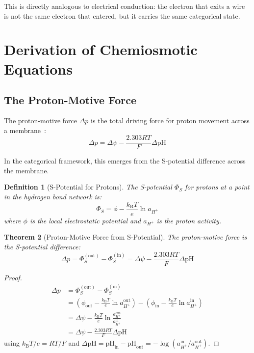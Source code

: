 \documentclass[twocolumn,showpacs,preprintnumbers,amsmath,amssymb,prd]{revtex4-2}
\newtheorem{theorem}{Theorem}[section]
\newtheorem{definition}[theorem]{Definition}
\newcommand{\kB}{k_{\text{B}}}
\begin{document}
This is directly analogous to electrical conduction: the electron that exits a wire is not the same electron that entered, but it carries the same categorical state.


\section{Derivation of Chemiosmotic Equations}
\label{sec:chemiosmotic}

\subsection{The Proton-Motive Force}

The proton-motive force $\Delta p$ is the total driving force for proton movement across a membrane~\cite{Nicholls2013}:
\begin{equation}
\Delta p = \Delta\psi - \frac{2.303 RT}{F}\Delta\text{pH}
\label{eq:pmf}
\end{equation}

In the categorical framework, this emerges from the S-potential difference across the membrane.

\begin{definition}[S-Potential for Protons]
\label{def:s_potential_h}
The S-potential $\Phi_S$ for protons at a point in the hydrogen bond network is:
\begin{equation}
\Phi_S = \phi - \frac{\kB T}{e}\ln a_{H^+}
\label{eq:s_potential_h}
\end{equation}
where $\phi$ is the local electrostatic potential and $a_{H^+}$ is the proton activity.
\end{definition}

\begin{theorem}[Proton-Motive Force from S-Potential]
\label{thm:pmf}
The proton-motive force is the S-potential difference:
\begin{equation}
\Delta p = \Phi_S^{(\text{out})} - \Phi_S^{(\text{in})} = \Delta\psi - \frac{2.303RT}{F}\Delta\text{pH}
\label{eq:pmf_s}
\end{equation}
\end{theorem}

\begin{proof}
\begin{align}
\Delta p &= \Phi_S^{(\text{out})} - \Phi_S^{(\text{in})} \\
&= \left(\phi_{\text{out}} - \frac{\kB T}{e}\ln a_{H^+}^{\text{out}}\right) - \left(\phi_{\text{in}} - \frac{\kB T}{e}\ln a_{H^+}^{\text{in}}\right) \\
&= \Delta\psi - \frac{\kB T}{e}\ln\frac{a_{H^+}^{\text{out}}}{a_{H^+}^{\text{in}}} \\
&= \Delta\psi - \frac{2.303RT}{F}\Delta\text{pH}
\end{align}
using $\kB T/e = RT/F$ and $\Delta\text{pH} = \text{pH}_{\text{in}} - \text{pH}_{\text{out}} = -\log(a_{H^+}^{\text{in}}/a_{H^+}^{\text{out}})$.
\end{proof}
\end{document}
